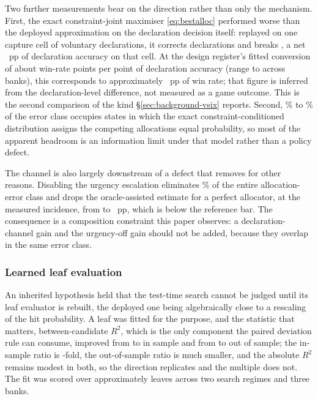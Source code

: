 Two further measurements bear on the direction rather than only the mechanism. First, the exact
constraint-joint maximiser \eqref{eq:bestalloc} performed worse than the deployed approximation on
the declaration decision itself: replayed on one capture cell of \vsevenJointCellDecls{} voluntary
declarations, it corrects \vsevenJointFixed{} declarations and breaks \vsevenJointBroken{}, a net
\vsevenJointWorseNet{}~pp of declaration accuracy on that cell. At the design register's fitted
conversion of about \vsevenDeclToWinConv{} win-rate points per point of declaration accuracy
(range \vsevenDeclToWinConvLo{} to \vsevenDeclToWinConvHi{} across banks), this corresponds to
approximately \vsevenJointWorseWin{}~pp of win rate; that figure is inferred from the
declaration-level difference, not measured as a game outcome. This is the second comparison of the
kind \S\ref{sec:background-vsix} reports. Second, \vsevenJointFlatLo\% to \vsevenJointFlatHi\% of
the error class occupies states in which the exact constraint-conditioned distribution assigns the
competing allocations equal probability, so most of the apparent headroom is an information limit
under that model rather than a policy defect.

The channel is also largely downstream of a defect that \sestina{} removes for other reasons.
Disabling the urgency escalation eliminates \vsevenLoneUrgencyShare\% of the entire
allocation-error class and drops the oracle-assisted estimate for a perfect allocator, at the
measured incidence, from \vsevenLoneCeilingBefore{} to \vsevenLoneCeilingAfter{}~pp, which is below
the reference bar. The
consequence is a composition constraint this paper observes: a declaration-channel gain and the
urgency-off gain should not be added, because they overlap in the same error class.

\subsubsection{Learned leaf evaluation}
\label{sec:development-leaf}

An inherited hypothesis held that the test-time search cannot be judged until its leaf evaluator is
rebuilt, the deployed one being algebraically close to a rescaling of the hit probability. A leaf was
fitted for the purpose, and the statistic that matters, between-candidate $R^2$, which is the only
component the paired deviation rule can consume, improved from \vsevenKoneRsqBefore{} to
\vsevenKoneRsqAfter{} in sample and from \vsevenKoneRsqOosBefore{} to \vsevenKoneRsqOosAfter{} out
of sample; the in-sample ratio is \vsevenKoneFold-fold, the out-of-sample ratio is much smaller,
and the absolute $R^2$ remains modest in both, so the direction replicates and the multiple does
not. The
fit was scored over approximately \vsevenKoneLeaves{} leaves across two search regimes and three
banks.

